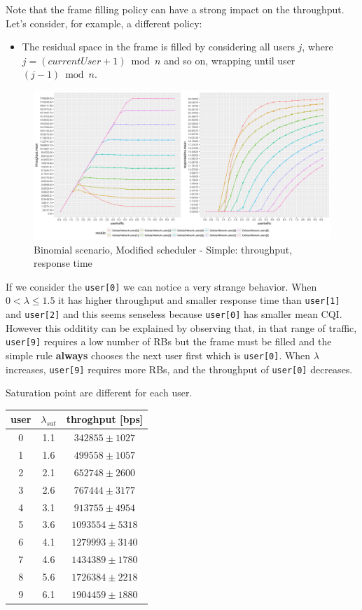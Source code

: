 Note that the frame filling policy can have a strong impact on the throughput. Let's consider, for example, a different policy: 
\begin{itemize}
\item The residual space in the frame is filled by considering all users \(j\), where \(j = (currentUser+1) \bmod n\) and so on, wrapping until user \((j-1) \bmod n\).
\end{itemize}
\begin{figure}[H]
  \includegraphics[width=1\textwidth]{images/binom_old}
  \caption{Binomial scenario, Modified scheduler - Simple: throughput, response time}
  \label{fig:Binomial scenario - Simple: throughput, response time}
\end{figure}
If we consider the \texttt{user[0]} we can notice a very strange behavior. When \(0 < \lambda \leq 1.5\) it has higher throughput and smaller response time than \texttt{user[1]} and \texttt{user[2]} and this seems senseless because \texttt{user[0]} has smaller mean CQI. However this odditity can be explained by observing that, in that range of traffic, \texttt{user[9]} requires a low number of RBs but the frame must be filled and the simple rule \textbf{always} chooses the next user first which is \texttt{user[0]}. When \(\lambda\) increases, \texttt{user[9]} requires more RBs, and the throughput of \texttt{user[0]} decreases.

Saturation point are different for each user.
\begin{center}
	\begin{tabular}{|c | c | c|}
	\hline
	 \textbf{user}  & \textbf{\(\lambda_{sat}\)}  & \textbf{throghput [bps]} \\ \hline
	 0 & 1.1 & $342855 \pm 1027$ \\ \hline
	 1 & 1.6 & $499558 \pm 1057$\\ \hline
	 2 & 2.1 & $652748 \pm 2600$\\ \hline
	 3 & 2.6 & $767444 \pm 3177$\\ \hline
	 4 & 3.1 & $913755 \pm 4954$\\ \hline
	 5 & 3.6 & $1093554 \pm 5318$\\ \hline
	 6 & 4.1 & $1279993 \pm 3140$\\ \hline
	 7 & 4.6 & $1434389 \pm 1780$ \\ \hline
	 8 & 5.6 & $1726384 \pm 2218$ \\ \hline
	 9 & 6.1 & $1904459 \pm 1880$ \\ \hline
	\end{tabular}
\end{center}

